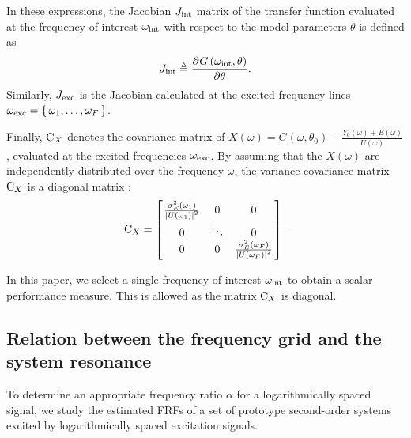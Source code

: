  In these expressions, the Jacobian $J_{\mathrm{int}}$ matrix of the transfer function evaluated at the frequency of interest $\omega_{\mathrm{int}}$ with respect to the model parameters $\theta$ is defined as
  \begin{equation}
    J_{\mathrm{int}} \triangleq
         \frac{{\partial}^{} G\left( \omega_{\mathrm{int}}, \theta \right) }{\partial \theta}
    \text{.}
  \end{equation}
  Similarly, $J_{\mathrm{exc}}$ is the Jacobian calculated at the excited frequency lines $\omega_{\mathrm{exc}} = \set{\omega_1, \ldots, \omega_F}$.

  Finally, $\mathrm{C}_{X}$ denotes the covariance matrix of $X\left(\omega\right) = G\left(\omega, \theta_0 \right) - \frac{Y_0\left(\omega \right) + E\left( \omega \right)  }{ U\left( \omega \right) } $, evaluated at the excited frequencies $\omega_{\mathrm{exc}}$.
  By assuming that the $X\left( \omega \right) $ are independently distributed over the frequency $\omega$, the variance-covariance matrix $\mathrm{C}_{X}$ is a diagonal matrix \citep{Pintelon2012}:
  \begin{equation}
    \mathrm{C}_{X} =
               \left[ \left.
               \begin{matrix}
                 \frac{\sigma^2_E\left(\omega_1 \right) }
                      {\left|  U\left(\omega_1 \right) \right|^2 } & 0 & 0 \\
                 0 & \ddots & 0 \\
                 0 & 0 & \frac{\sigma^2_E\left(\omega_F \right) }
                              {\left| U\left(\omega_F \right) \right|^2 }
               \end{matrix}
               \right.^{\vphantom{x}}\right]
    \text{.}
  \end{equation}

  In this paper, we select a single frequency of interest $\omega_{\mathrm{int}}$
  to obtain a scalar performance measure.
  This is allowed as the matrix $\mathrm{C}_{X}$ is diagonal.

  \subsection{Relation between the frequency grid and the system resonance} \label{sec:relationLogGridSystem}
  To determine an appropriate frequency ratio $\alpha$ for a logarithmically spaced signal, we study the estimated \glspl{FRF} of a set of prototype second-order systems excited by logarithmically spaced excitation signals.

